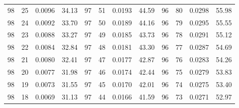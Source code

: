 \begin{tabular}{llll|llll|llll}
98 & 25 & 0.0096 & 34.13 & 97 & 51 & 0.0193 & 44.59 & 96 & 80 & 0.0298 & 55.98\\
98 & 24 & 0.0092 & 33.70 & 97 & 50 & 0.0189 & 44.16 & 96 & 79 & 0.0295 & 55.55\\
98 & 23 & 0.0088 & 33.27 & 97 & 49 & 0.0185 & 43.73 & 96 & 78 & 0.0291 & 55.12\\
98 & 22 & 0.0084 & 32.84 & 97 & 48 & 0.0181 & 43.30 & 96 & 77 & 0.0287 & 54.69\\
98 & 21 & 0.0080 & 32.41 & 97 & 47 & 0.0177 & 42.87 & 96 & 76 & 0.0283 & 54.26\\
98 & 20 & 0.0077 & 31.98 & 97 & 46 & 0.0174 & 42.44 & 96 & 75 & 0.0279 & 53.83\\
98 & 19 & 0.0073 & 31.55 & 97 & 45 & 0.0170 & 42.01 & 96 & 74 & 0.0275 & 53.40\\
98 & 18 & 0.0069 & 31.13 & 97 & 44 & 0.0166 & 41.59 & 96 & 73 & 0.0271 & 52.97\\
\bottomrule
\end{tabular}
\newpage
